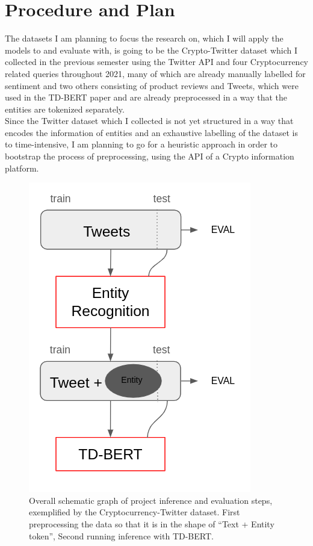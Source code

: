 \documentclass[11pt]{article}
\begin{document}
\section{Procedure and Plan}
The datasets I am planning to focus the research on, which I will apply the models to and evaluate with, is going to be the Crypto-Twitter dataset which I collected in the previous semester using the Twitter API and four Cryptocurrency related queries throughout 2021, many of which are already manually labelled for sentiment and two others consisting of product reviews and Tweets, which were used in the TD-BERT paper and are already preprocessed in a way that the entities are tokenized separately. \\
Since the Twitter dataset which I collected is not yet structured in a way that encodes the information of entities and an exhaustive labelling of the dataset is to time-intensive, I am planning to go for a heuristic approach in order to bootstrap the process of preprocessing, using the API of a Crypto information platform. \\


\begin{figure}[H]
\centering
\includegraphics[scale=0.6]{figures/im22_schematic_graph.png}
\caption {Overall schematic graph of project inference and evaluation steps, exemplified by the Cryptocurrency-Twitter dataset. First preprocessing the data so that it is in the shape of ``Text + Entity token'', Second running inference with TD-BERT.}
\label{fig:schema_graph}
\end{figure}

\medskip


\end{document}
